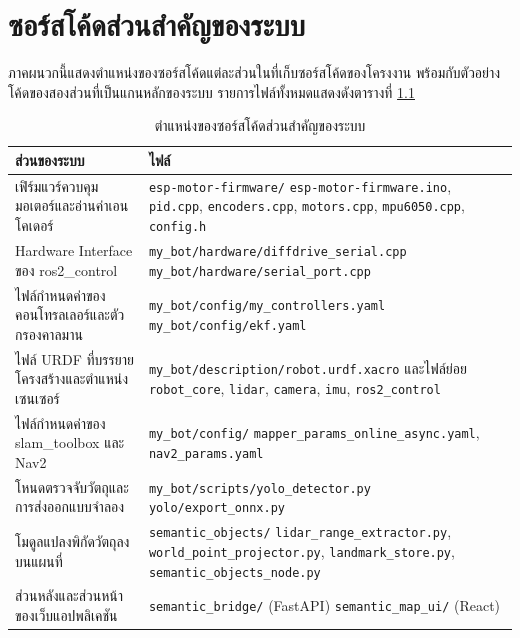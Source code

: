 \documentclass[a4paper,12pt]{report}
\begin{document}
\chapter{ซอร์สโค้ดส่วนสำคัญของระบบ}

ภาคผนวกนี้แสดงตำแหน่งของซอร์สโค้ดแต่ละส่วนในที่เก็บซอร์สโค้ดของโครงงาน
พร้อมกับตัวอย่างโค้ดของสองส่วนที่เป็นแกนหลักของระบบ
รายการไฟล์ทั้งหมดแสดงดังตารางที่ \ref{tab:srcmap}

\begin{table}[htbp]
\centering
\caption[ตำแหน่งของซอร์สโค้ดส่วนสำคัญของระบบ (ภาคผนวก ข)]{ตำแหน่งของซอร์สโค้ดส่วนสำคัญของระบบ}
\label{tab:srcmap}
\small
\begin{tabularx}{\textwidth}{|X|X|}
\hline
\textbf{ส่วนของระบบ} & \textbf{ไฟล์} \\
\hline
เฟิร์มแวร์ควบคุมมอเตอร์และอ่านค่าเอนโคเดอร์
 & \texttt{esp-motor-firmware/} \newline
   \texttt{esp-motor-firmware.ino}, \texttt{pid.cpp}, \texttt{encoders.cpp},
   \texttt{motors.cpp}, \texttt{mpu6050.cpp}, \texttt{config.h} \\
\hline
Hardware Interface ของ ros2\_control
 & \texttt{my\_bot/hardware/diffdrive\_serial.cpp} \newline
   \texttt{my\_bot/hardware/serial\_port.cpp} \\
\hline
ไฟล์กำหนดค่าของคอนโทรลเลอร์และตัวกรองคาลมาน
 & \texttt{my\_bot/config/my\_controllers.yaml} \newline
   \texttt{my\_bot/config/ekf.yaml} \\
\hline
ไฟล์ URDF ที่บรรยายโครงสร้างและตำแหน่งเซนเซอร์
 & \texttt{my\_bot/description/robot.urdf.xacro} และไฟล์ย่อย
   \texttt{robot\_core}, \texttt{lidar}, \texttt{camera}, \texttt{imu},
   \texttt{ros2\_control} \\
\hline
ไฟล์กำหนดค่าของ slam\_toolbox และ Nav2
 & \texttt{my\_bot/config/} \newline
   \texttt{mapper\_params\_online\_async.yaml}, \texttt{nav2\_params.yaml} \\
\hline
โหนดตรวจจับวัตถุและการส่งออกแบบจำลอง
 & \texttt{my\_bot/scripts/yolo\_detector.py} \newline
   \texttt{yolo/export\_onnx.py} \\
\hline
โมดูลแปลงพิกัดวัตถุลงบนแผนที่
 & \texttt{semantic\_objects/} \newline
   \texttt{lidar\_range\_extractor.py}, \texttt{world\_point\_projector.py},
   \texttt{landmark\_store.py}, \texttt{semantic\_objects\_node.py} \\
\hline
ส่วนหลังและส่วนหน้าของเว็บแอปพลิเคชัน
 & \texttt{semantic\_bridge/} (FastAPI) \newline
   \texttt{semantic\_map\_ui/} (React) \\
\hline
\end{tabularx}
\end{table}
\end{document}
